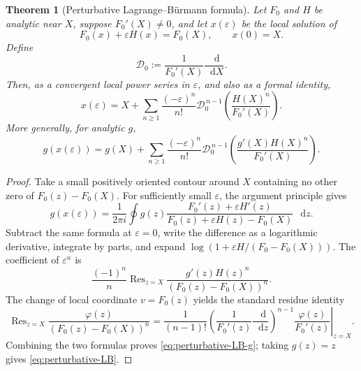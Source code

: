 \documentclass[11pt,oneside]{article}
\theoremstyle{plain}
\newtheorem{theorem}{Theorem}[section]
\theoremstyle{definition}
\theoremstyle{remark}
\newcommand{\dd}{\mathop{}\!\mathrm{d}}
\DeclareMathOperator{\Res}{Res}
\begin{document}
\begin{theorem}[Perturbative Lagrange--B\"urmann formula]
\label{thm:perturbative-LB}
Let \(F_0\) and \(H\) be analytic near \(X\), suppose
\(F_0'(X)\ne0\), and let \(x(\varepsilon)\) be the local solution of
\begin{equation}
 F_0(x)+\varepsilon H(x)=F_0(X),
 \qquad x(0)=X.
 \label{eq:perturbed-equation}
\end{equation}
Define
\begin{equation}
 \mathscr D_0:=\frac1{F_0'(X)}\frac{\dd}{\dd X}.
 \label{eq:D0-general}
\end{equation}
Then, as a convergent local power series in \(\varepsilon\), and also as a
formal identity,
\begin{equation}
 x(\varepsilon)
 =X+\sum_{n\ge1}\frac{(-\varepsilon)^n}{n!}
 \mathscr D_0^{\,n-1}
 \left(\frac{H(X)^n}{F_0'(X)}\right).
 \label{eq:perturbative-LB}
\end{equation}
More generally, for analytic \(g\),
\begin{equation}
 g(x(\varepsilon))
 =g(X)+\sum_{n\ge1}\frac{(-\varepsilon)^n}{n!}
 \mathscr D_0^{\,n-1}
 \left(\frac{g'(X)H(X)^n}{F_0'(X)}\right).
 \label{eq:perturbative-LB-g}
\end{equation}
\end{theorem}

\begin{proof}
Take a small positively oriented contour around \(X\) containing no other zero
of \(F_0(z)-F_0(X)\).  For sufficiently small \(\varepsilon\), the argument
principle gives
\begin{equation}
 g(x(\varepsilon))
 =\frac{1}{2\pi i}\oint
 g(z)\frac{F_0'(z)+\varepsilon H'(z)}
 {F_0(z)+\varepsilon H(z)-F_0(X)}\,\dd z.
 \label{eq:argument-principle-g}
\end{equation}
Subtract the same formula at \(\varepsilon=0\), write the difference as a
logarithmic derivative, integrate by parts, and expand
\(\log(1+\varepsilon H/(F_0-F_0(X)))\).  The coefficient of
\(\varepsilon^n\) is
\begin{equation}
 \frac{(-1)^n}{n}
 \Res_{z=X}\frac{g'(z)H(z)^n}{(F_0(z)-F_0(X))^n}.
 \label{eq:residue-step}
\end{equation}
The change of local coordinate \(v=F_0(z)\) yields the standard residue
identity
\begin{equation}
 \Res_{z=X}\frac{\varphi(z)}{(F_0(z)-F_0(X))^n}
 =\frac1{(n-1)!}
 \left.
 \left(\frac1{F_0'(z)}\frac{\dd}{\dd z}\right)^{n-1}
 \frac{\varphi(z)}{F_0'(z)}
 \right|_{z=X}.
 \label{eq:residue-coordinate}
\end{equation}
Combining the two formulas proves \cref{eq:perturbative-LB-g}; taking
\(g(z)=z\) gives \cref{eq:perturbative-LB}.
\end{proof}
\end{document}
